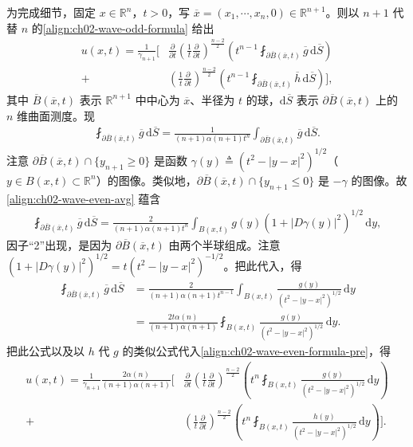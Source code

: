 \documentclass[../../main.tex]{subfiles}
\begin{document}
为完成细节，固定 $x\in\mathbb{R}^n$，$t>0$，写 $\overline{x}=(x_1,\cdots,x_n,0)\in\mathbb{R}^{n+1}$。则以 $n+1$ 代替 $n$ 的\eqref{align:ch02-wave-odd-formula} 给出
\begin{align}\label{align:ch02-wave-even-formula-pre}
u(x,t)=\frac{1}{\gamma_{n+1}}\Bigg[&\frac{\partial}{\partial t}\left(\frac{1}{t}\frac{\partial}{\partial t}\right)^{\frac{n-2}{2}}\left(t^{n-1}\fint_{\partial\overline{B}(\overline{x},t)}\overline{g}\,\mathrm{d}\overline{S}\right)\\
+&\left(\frac{1}{t}\frac{\partial}{\partial t}\right)^{\frac{n-2}{2}}\left(t^{n-1}\fint_{\partial\overline{B}(\overline{x},t)}\overline{h}\,\mathrm{d}\overline{S}\right)\Bigg],\nonumber
\end{align}
其中 $\overline{B}(\overline{x},t)$ 表示 $\mathbb{R}^{n+1}$ 中中心为 $\overline{x}$、半径为 $t$ 的球，$\mathrm{d}\overline{S}$ 表示 $\partial\overline{B}(\overline{x},t)$ 上的 $n$ 维曲面测度。现
\begin{align}\label{align:ch02-wave-even-avg}
\fint_{\partial\overline{B}(\overline{x},t)}\overline{g}\,\mathrm{d}\overline{S}=\frac{1}{(n+1)\alpha(n+1)t^n}\int_{\partial\overline{B}(\overline{x},t)}\overline{g}\,\mathrm{d}\overline{S}.
\end{align}
注意 $\partial\overline{B}(\overline{x},t)\cap\{y_{n+1}\geqslant 0\}$ 是函数 $\gamma(y)\triangleq(t^2-|y-x|^2)^{1/2}$（$y\in B(x,t)\subset\mathbb{R}^n$）的图像。类似地，$\partial\overline{B}(\overline{x},t)\cap\{y_{n+1}\leqslant 0\}$ 是 $-\gamma$ 的图像。故\eqref{align:ch02-wave-even-avg} 蕴含
\begin{align*}
\fint_{\partial\overline{B}(\overline{x},t)}\overline{g}\,\mathrm{d}\overline{S}
=\frac{2}{(n+1)\alpha(n+1)t^n}\int_{B(x,t)}g(y)(1+|D\gamma(y)|^2)^{1/2}\,\mathrm{d}y,
\end{align*}
因子``2''出现，是因为 $\partial\overline{B}(\overline{x},t)$ 由两个半球组成。注意 $(1+|D\gamma(y)|^2)^{1/2}=t(t^2-|y-x|^2)^{-1/2}$。把此代入，得
\begin{align*}
\fint_{\partial\overline{B}(\overline{x},t)}\overline{g}\,\mathrm{d}\overline{S}
&=\frac{2}{(n+1)\alpha(n+1)t^{n-1}}\int_{B(x,t)}\frac{g(y)}{(t^2-|y-x|^2)^{1/2}}\,\mathrm{d}y\\
&=\frac{2t\alpha(n)}{(n+1)\alpha(n+1)}\fint_{B(x,t)}\frac{g(y)}{(t^2-|y-x|^2)^{1/2}}\,\mathrm{d}y.
\end{align*}
把此公式以及以 $h$ 代 $g$ 的类似公式代入\eqref{align:ch02-wave-even-formula-pre}，得
\begin{align*}
u(x,t)=\frac{1}{\gamma_{n+1}}\frac{2\alpha(n)}{(n+1)\alpha(n+1)}
\Bigg[&\frac{\partial}{\partial t}\left(\frac{1}{t}\frac{\partial}{\partial t}\right)^{\frac{n-2}{2}}\left(t^n\fint_{B(x,t)}\frac{g(y)}{(t^2-|y-x|^2)^{1/2}}\,\mathrm{d}y\right)\\
+&\left(\frac{1}{t}\frac{\partial}{\partial t}\right)^{\frac{n-2}{2}}\left(t^n\fint_{B(x,t)}\frac{h(y)}{(t^2-|y-x|^2)^{1/2}}\,\mathrm{d}y\right)\Bigg].
\end{align*}
\end{document}
